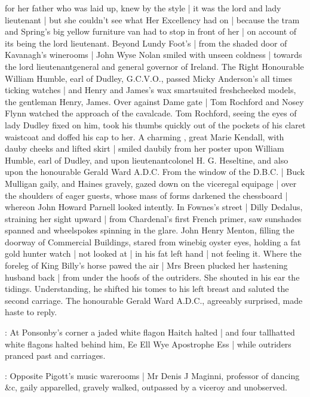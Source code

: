 for her father who was laid up,
knew by the style |
it was the lord and lady lieutenant |
but she couldn't see
what Her Excellency had on |
because the tram 
and Spring's big yellow furniture van
had to stop in front of her |
on account of its being the lord lieutenant.
Beyond Lundy Foot's |
from the shaded door of Kavanagh's winerooms |
John Wyse Nolan smiled with unseen coldness |
towards the lord lieutenantgeneral and general governor of Ireland.
The Right Honourable
William Humble,
earl of Dudley,
G.C.V.O.,
passed Micky Anderson's
all times ticking watches |
and Henry and James's wax smartsuited freshcheeked models,
the gentleman Henry,
 James.
Over against Dame gate |
Tom Rochford and Nosey Flynn
watched the approach of the cavalcade.
Tom Rochford,
seeing the eyes of lady Dudley fixed on him,
took his thumbs
quickly out of the pockets of his claret waistcoat
and doffed his cap to her.
A charming ,
great Marie Kendall, with dauby cheeks and lifted skirt |
smiled daubily from her poster
upon William Humble, earl of Dudley,
and upon lieutenant\-colonel H. G. Heseltine,
and also upon the honourable Gerald Ward A.D.C.
From the window of the D.B.C. |
Buck Mulligan gaily,
and Haines gravely,
gazed down on the viceregal equipage |
over the shoulders of eager guests,
whose mass of forms
darkened the chessboard |
whereon John Howard Parnell looked intently.
In Fownes's street |
Dilly Dedalus,
straining her sight upward |
from Chardenal's first French primer,
saw sunshades spanned
and wheelspokes spinning in the glare.
John Henry Menton,
filling the doorway of Commercial Buildings,
stared from winebig oyster eyes,
holding a fat gold hunter watch |
not looked at |
in his fat left hand |
not feeling it.
Where the foreleg of King Billy's horse pawed the air |
Mrs Breen plucked her hastening husband back |
from under the hoofs of the outriders.
She shouted in his ear the tidings.
Understanding, he shifted his tomes to his left breast
and saluted the second carriage.
The honourable Gerald Ward A.D.C.,
agreeably surprised,
made haste to reply.

:
At Ponsonby's corner
a jaded white flagon Haitch \stage{[H.]} halted |
and four tallhatted white flagons halted behind him,
Ee Ell Wye Apostrophe Ess \stage{[E.L.Y.'S]} |
while outriders pranced past
and carriages.

:
Opposite Pigott's music warerooms |
Mr Denis J Maginni,
professor of dancing \&c,
gaily apparelled,
gravely walked,
outpassed by a viceroy and unobserved.

